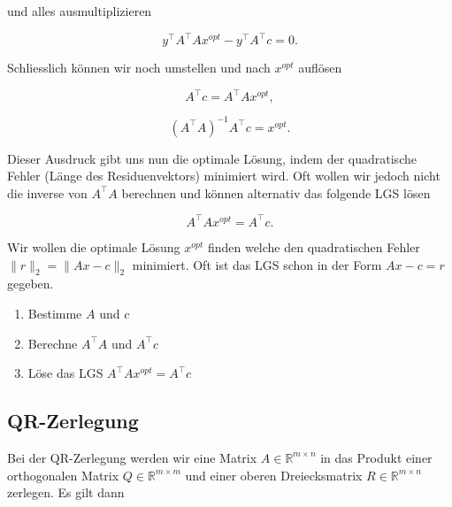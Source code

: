 und alles ausmultiplizieren

\begin{equation*}
    y^\top A^\top A x^{opt} - y^\top A^\top c  = 0.
\end{equation*}

Schliesslich können wir noch umstellen und nach \( x^{opt} \) auflösen

\begin{equation*}
    A^\top c = A^\top A x^{opt},
\end{equation*}

\begin{equation*}
    (A^\top A)^{-1} A^\top c = x^{opt}.
\end{equation*}

Dieser Ausdruck gibt uns nun die optimale Lösung, indem der quadratische Fehler (Länge des Residuenvektors) minimiert wird. Oft wollen wir jedoch nicht die inverse von \( A^\top A \) berechnen und können alternativ das folgende LGS lösen

\begin{equation*}
    A^\top A x^{opt} = A^\top c.
\end{equation*}

\begin{tcolorbox}[colback=gray!30, colframe=gray!80, title=Kleinste Quadrate]
    Wir wollen die optimale Lösung \( x^{opt} \) finden welche den quadratischen Fehler \( \lVert r \rVert_2 = \lVert A x - c \rVert_2 \) minimiert. Oft ist das LGS schon in der Form \( Ax - c = r \) gegeben. 
    \begin{enumerate}
        \item Bestimme \( A \) und \( c \)
        \item Berechne \( A^\top A \) und \( A^\top c \)
        \item Löse das LGS \( A^\top A x^{opt} = A^\top c \)
    \end{enumerate}
\end{tcolorbox}

\subsection{QR-Zerlegung}

Bei der QR-Zerlegung werden wir eine Matrix \( A \in \mathbb{R}^{m \times n} \) in das Produkt einer orthogonalen Matrix \( Q \in \mathbb{R}^{m \times m} \) und einer oberen Dreiecksmatrix \( R \in \mathbb{R}^{m \times n} \) zerlegen. Es gilt dann 

\vspace{1\baselineskip}

